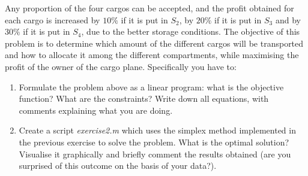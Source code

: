 \documentclass[unicode,11pt,a4paper,oneside,numbers=endperiod,openany]{scrartcl}
\begin{document}
Any proportion of the four cargos can be accepted, and the profit obtained for each cargo is increased by $10\%$ if it is put in $S_2$, by $20\%$ if it is put in $S_3$ and by $30\%$ if it is put in $S_4$, due to the better storage conditions. The objective of this problem is to determine which amount of the different cargos will be transported and how to allocate it among the different compartments, while maximising the profit of the owner of the cargo plane. Specifically you have to:
\begin{enumerate}
	\item Formulate the problem above as a linear program: what is the objective function? What are the constraints? Write down all equations, with comments explaining what you are doing.
	\item Create a script \emph{exercise2.m} which uses the simplex method implemented in the previous exercise to solve the problem. What is the optimal solution? Visualise it graphically and briefly comment the results obtained (are you surprised of this outcome on the basis of your data?).
\end{enumerate}

\vspace{20px}
\end{document}
